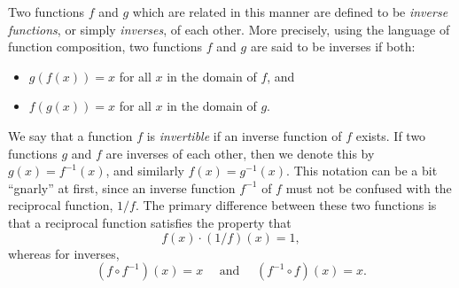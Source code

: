 \documentclass[12pt]{article}
\theoremstyle{definition}
\begin{document}
Two functions $f$ and $g$ which are related in this manner are defined to be {\it inverse functions}, or simply {\it inverses}, of each other.  More precisely, using the language of function composition, two functions $f$ and $g$ are said to be inverses if both:

\begin{itemize}
	\item $g(f(x)) = x$ for all $x$ in the domain of $f$, and 
	\item $f(g(x)) = x$ for all $x$ in the domain of $g$.
\end{itemize}

We say that a function $f$ is {\it invertible} if an inverse function of $f$ exists.  If two functions $g$ and $f$ are inverses of each other, then we denote this by $g(x)=f^{-1}(x)$, and similarly $f(x)=g^{-1}(x)$.  This notation can be a bit ``gnarly'' at first, since an inverse function $f^{-1}$ of $f$ must not be confused with the reciprocal function, $1/f$.  The primary difference between these two functions is that a reciprocal function satisfies the property that $$f(x)\cdot (1/f)(x)=1,$$ whereas for inverses, $$(f\circ f^{-1})(x)=x \text{~~~~and~~~~} (f^{-1}\circ f)(x)=x.$$



\begin{center}
\end{center}
\end{document}
